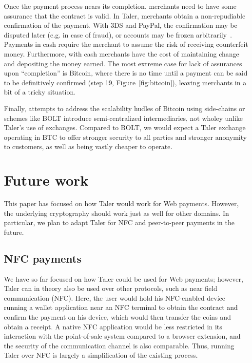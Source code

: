 \documentclass{llncs}
\begin{document}
Once the payment process nears its completion, merchants need to have
some assurance that the contract is valid.  In Taler, merchants
obtain a non-repudiable confirmation of the payment.  With 3DS and
PayPal, the confirmation may be disputed later (e.g. in case of
fraud), or accounts may be frozen arbitrarily~\cite{diaspora2011}.
Payments in cash require the merchant to assume the risk of receiving
counterfeit money.
Furthermore, with cash merchants have the cost of maintaining change
and depositing the money earned.  The most extreme case for lack of
assurances upon ``completion'' is Bitcoin, where there is no time
until a payment can be said to be definitively confirmed (step 19,
Figure~\ref{fig:bitcoin}), leaving merchants in a bit of a tricky
situation.

Finally, attempts to address the scalability hudles of Bitcoin using
side-chains or schemes like BOLT introduce semi-centralized
intermediaries, not wholey unlike Taler's use of exchanges.  Compared
to BOLT, we would expect a Taler exchange operating in BTC to offer
stronger security to all parties and stronger anonymity to customers,
as well as being vastly cheaper to operate.


\section{Future work}

This paper has focused on how Taler would work for Web payments.
However, the underlying cryptography should work just as well for
other domains.  In particular, we plan to adapt Taler for NFC and
peer-to-peer payments in the future.

\subsection{NFC payments}

We have so far focused on how Taler could be used for Web payments;
however, Taler can in theory also be used over other protocols, such
as near field communication (NFC).  Here, the user would hold his
NFC-enabled device running a wallet application near an NFC terminal
to obtain the contract and confirm the payment on his device, which
would then transfer the coins and obtain a receipt.  A native NFC
application would be less restricted in its interaction with the
point-of-sale system compared to a browser extension, and the security
of the communication channel is also comparable. Thus, running
Taler over NFC is largely a simplification of the existing process.
\end{document}
